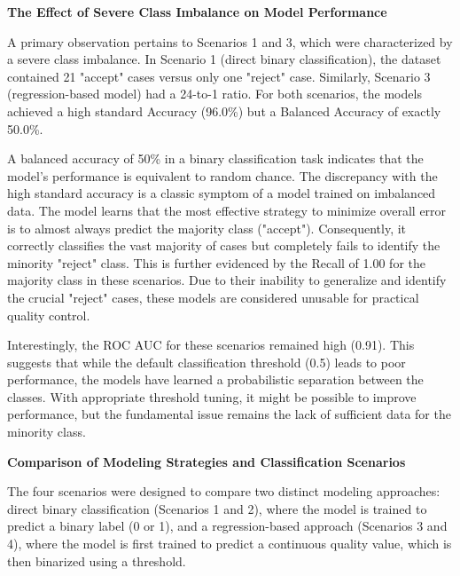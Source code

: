 \textbf{The Effect of Severe Class Imbalance on Model Performance}

A primary observation pertains to Scenarios 1 and 3, which were characterized by a severe class imbalance. In Scenario 1 (direct binary classification), the dataset contained 21 "accept" cases versus only one "reject" case. Similarly, Scenario 3 (regression-based model) had a 24-to-1 ratio. For both scenarios, the models achieved a high standard Accuracy (96.0\%) but a Balanced Accuracy of exactly 50.0\%.

A balanced accuracy of 50\% in a binary classification task indicates that the model's performance is equivalent to random chance. The discrepancy with the high standard accuracy is a classic symptom of a model trained on imbalanced data. The model learns that the most effective strategy to minimize overall error is to almost always predict the majority class ("accept"). Consequently, it correctly classifies the vast majority of cases but completely fails to identify the minority "reject" class. This is further evidenced by the Recall of 1.00 for the majority class in these scenarios. Due to their inability to generalize and identify the crucial "reject" cases, these models are considered unusable for practical quality control.

Interestingly, the ROC AUC for these scenarios remained high (0.91). This suggests that while the default classification threshold (0.5) leads to poor performance, the models have learned a probabilistic separation between the classes. With appropriate threshold tuning, it might be possible to improve performance, but the fundamental issue remains the lack of sufficient data for the minority class.

\textbf{Comparison of Modeling Strategies and Classification Scenarios}

The four scenarios were designed to compare two distinct modeling approaches: direct binary classification (Scenarios 1 and 2), where the model is trained to predict a binary label (0 or 1), and a regression-based approach (Scenarios 3 and 4), where the model is first trained to predict a continuous quality value, which is then binarized using a threshold.

